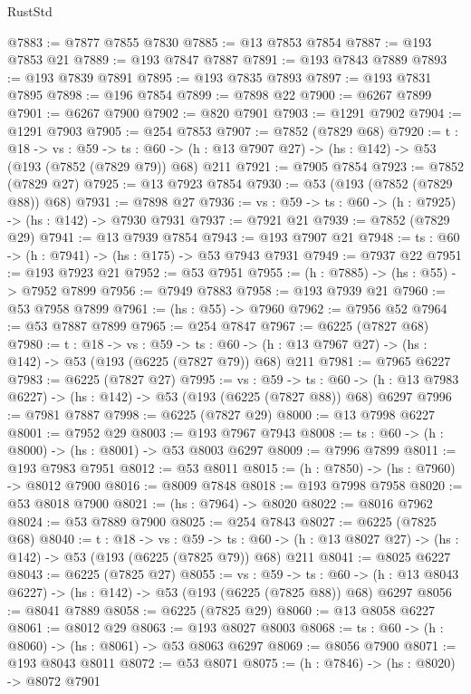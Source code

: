 \begin{lexlean}{RustStd}
\begin{coremodule}
@7883 := @7877 @7855 @7830
@7885 := @13 @7853 @7854
@7887 := @193 @7853 @21
@7889 := @193 @7847 @7887
@7891 := @193 @7843 @7889
@7893 := @193 @7839 @7891
@7895 := @193 @7835 @7893
@7897 := @193 @7831 @7895
@7898 := @196 @7854
@7899 := @7898 @22
@7900 := @6267 @7899
@7901 := @6267 @7900
@7902 := @820 @7901
@7903 := @1291 @7902
@7904 := @1291 @7903
@7905 := @254 @7853
@7907 := @7852 (@7829 @68)
@7920 := {t : @18} ->
  {vs : @59} ->
  {ts : @60} -> (h : @13 @7907 @27) -> (hs : @142) -> @53 (@193 (@7852 (@7829 @79)) @68) @211
@7921 := @7905 @7854
@7923 := @7852 (@7829 @27)
@7925 := @13 @7923 @7854
@7930 := @53 (@193 (@7852 (@7829 @88)) @68)
@7931 := @7898 @27
@7936 := {vs : @59} -> {ts : @60} -> (h : @7925) -> (hs : @142) -> @7930 @7931
@7937 := @7921 @21
@7939 := @7852 (@7829 @29)
@7941 := @13 @7939 @7854
@7943 := @193 @7907 @21
@7948 := {ts : @60} -> (h : @7941) -> (hs : @175) -> @53 @7943 @7931
@7949 := @7937 @22
@7951 := @193 @7923 @21
@7952 := @53 @7951
@7955 := (h : @7885) -> (hs : @55) -> @7952 @7899
@7956 := @7949 @7883
@7958 := @193 @7939 @21
@7960 := @53 @7958 @7899
@7961 := (hs : @55) -> @7960
@7962 := @7956 @52
@7964 := @53 @7887 @7899
@7965 := @254 @7847
@7967 := @6225 (@7827 @68)
@7980 := {t : @18} ->
  {vs : @59} ->
  {ts : @60} -> (h : @13 @7967 @27) -> (hs : @142) -> @53 (@193 (@6225 (@7827 @79)) @68) @211
@7981 := @7965 @6227
@7983 := @6225 (@7827 @27)
@7995 := {vs : @59} ->
  {ts : @60} -> (h : @13 @7983 @6227) -> (hs : @142) -> @53 (@193 (@6225 (@7827 @88)) @68) @6297
@7996 := @7981 @7887
@7998 := @6225 (@7827 @29)
@8000 := @13 @7998 @6227
@8001 := @7952 @29
@8003 := @193 @7967 @7943
@8008 := {ts : @60} -> (h : @8000) -> (hs : @8001) -> @53 @8003 @6297
@8009 := @7996 @7899
@8011 := @193 @7983 @7951
@8012 := @53 @8011
@8015 := (h : @7850) -> (hs : @7960) -> @8012 @7900
@8016 := @8009 @7848
@8018 := @193 @7998 @7958
@8020 := @53 @8018 @7900
@8021 := (hs : @7964) -> @8020
@8022 := @8016 @7962
@8024 := @53 @7889 @7900
@8025 := @254 @7843
@8027 := @6225 (@7825 @68)
@8040 := {t : @18} ->
  {vs : @59} ->
  {ts : @60} -> (h : @13 @8027 @27) -> (hs : @142) -> @53 (@193 (@6225 (@7825 @79)) @68) @211
@8041 := @8025 @6227
@8043 := @6225 (@7825 @27)
@8055 := {vs : @59} ->
  {ts : @60} -> (h : @13 @8043 @6227) -> (hs : @142) -> @53 (@193 (@6225 (@7825 @88)) @68) @6297
@8056 := @8041 @7889
@8058 := @6225 (@7825 @29)
@8060 := @13 @8058 @6227
@8061 := @8012 @29
@8063 := @193 @8027 @8003
@8068 := {ts : @60} -> (h : @8060) -> (hs : @8061) -> @53 @8063 @6297
@8069 := @8056 @7900
@8071 := @193 @8043 @8011
@8072 := @53 @8071
@8075 := (h : @7846) -> (hs : @8020) -> @8072 @7901

\end{coremodule}
\end{lexlean}
